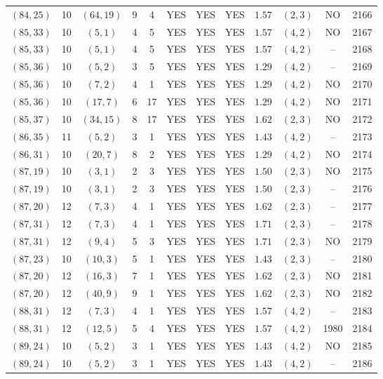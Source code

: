 \begin{longtable}{|c|c|c|c|c|c|c|c|c|c|c|c|}
$(84,25)$ & 10 & $(64,19)$ & 9 & 4 & YES & YES & YES & $1.57$ & $(2,3)$ & NO & 2166\\
$(85,33)$ & 10 & $(5,1)$ & 4 & 5 & YES & YES & YES & $1.57$ & $(4,2)$ & NO & 2167\\
$(85,33)$ & 10 & $(5,1)$ & 4 & 5 & YES & YES & YES & $1.57$ & $(4,2)$ & -- & 2168\\
$(85,36)$ & 10 & $(5,2)$ & 3 & 5 & YES & YES & YES & $1.29$ & $(4,2)$ & -- & 2169\\
$(85,36)$ & 10 & $(7,2)$ & 4 & 1 & YES & YES & YES & $1.29$ & $(4,2)$ & NO & 2170\\
$(85,36)$ & 10 & $(17,7)$ & 6 & 17 & YES & YES & YES & $1.29$ & $(4,2)$ & NO & 2171\\
$(85,37)$ & 10 & $(34,15)$ & 8 & 17 & YES & YES & YES & $1.62$ & $(2,3)$ & NO & 2172\\
$(86,35)$ & 11 & $(5,2)$ & 3 & 1 & YES & YES & YES & $1.43$ & $(4,2)$ & -- & 2173\\
$(86,31)$ & 10 & $(20,7)$ & 8 & 2 & YES & YES & YES & $1.29$ & $(4,2)$ & NO & 2174\\
$(87,19)$ & 10 & $(3,1)$ & 2 & 3 & YES & YES & YES & $1.50$ & $(2,3)$ & NO & 2175\\
$(87,19)$ & 10 & $(3,1)$ & 2 & 3 & YES & YES & YES & $1.50$ & $(2,3)$ & -- & 2176\\
$(87,20)$ & 12 & $(7,3)$ & 4 & 1 & YES & YES & YES & $1.62$ & $(2,3)$ & -- & 2177\\
$(87,31)$ & 12 & $(7,3)$ & 4 & 1 & YES & YES & YES & $1.71$ & $(2,3)$ & -- & 2178\\
$(87,31)$ & 12 & $(9,4)$ & 5 & 3 & YES & YES & YES & $1.71$ & $(2,3)$ & NO & 2179\\
$(87,23)$ & 10 & $(10,3)$ & 5 & 1 & YES & YES & YES & $1.43$ & $(2,3)$ & -- & 2180\\
$(87,20)$ & 12 & $(16,3)$ & 7 & 1 & YES & YES & YES & $1.62$ & $(2,3)$ & NO & 2181\\
$(87,20)$ & 12 & $(40,9)$ & 9 & 1 & YES & YES & YES & $1.62$ & $(2,3)$ & NO & 2182\\
$(88,31)$ & 12 & $(7,3)$ & 4 & 1 & YES & YES & YES & $1.57$ & $(4,2)$ & -- & 2183\\
$(88,31)$ & 12 & $(12,5)$ & 5 & 4 & YES & YES & YES & $1.57$ & $(4,2)$ & 1980 & 2184\\
$(89,24)$ & 10 & $(5,2)$ & 3 & 1 & YES & YES & YES & $1.43$ & $(4,2)$ & NO & 2185\\
$(89,24)$ & 10 & $(5,2)$ & 3 & 1 & YES & YES & YES & $1.43$ & $(4,2)$ & -- & 2186\\

\end{longtable}
